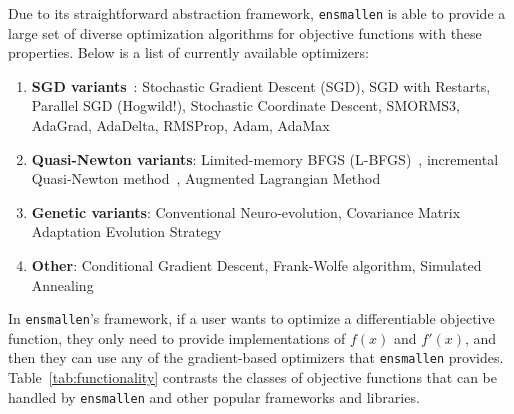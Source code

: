 \documentclass{article}
\begin{document}
Due to its straightforward abstraction framework, {\tt ensmallen} is able to
provide a large set of diverse optimization algorithms for objective functions
with these properties.  Below is a list of currently available optimizers:

\vspace*{-0.4em}
\begin{enumerate}[{~~~$\bullet$}]
\small
  \item {\bf SGD variants}~\cite{Robbins_1951,kingma2015adam}:
      Stochastic Gradient Descent (SGD),
      SGD with Restarts,
      Parallel SGD (Hogwild!),
      Stochastic Coordinate Descent, 
      SMORMS3, AdaGrad,
      AdaDelta, RMSProp, Adam, AdaMax

  \item {\bf Quasi-Newton variants}:
      Limited-memory BFGS (L-BFGS)~\cite{zhu1997algorithm},
      incremental Quasi-Newton method~\cite{Mokhtari_2018},
      Augmented Lagrangian Method~\cite{Hestenes_1969}

  \item {\bf Genetic variants}:
        Conventional Neuro-evolution,
        Covariance Matrix Adaptation Evolution Strategy

  \item {\bf Other}: Conditional Gradient Descent, Frank-Wolfe algorithm, Simulated Annealing~\cite{kirkpatrick1983optimization}

\end{enumerate}

In {\tt ensmallen}'s framework, if a user wants to optimize a differentiable objective
function, they only need to provide implementations of $f(x)$ and $f'(x)$, and
then they can use any of the gradient-based optimizers that {\tt ensmallen}
provides.  Table~\ref{tab:functionality} contrasts 
the classes of objective functions that can be handled by {\tt ensmallen}
and other popular frameworks and libraries.
\end{document}
